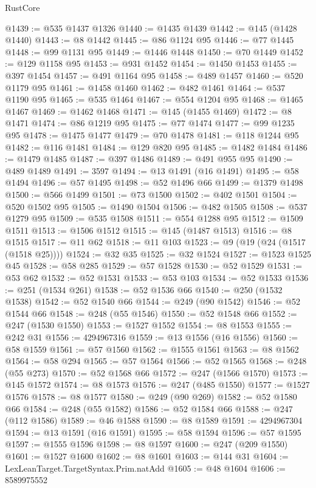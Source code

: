 \begin{lexlean}{RustCore}
\begin{coremodule}
@1439 := @535 @1437 @1326
@1440 := @1435 @1439
@1442 := @145 (@1428 @1440)
@1443 := @8 @1442
@1445 := @86 @1124 @95
@1446 := @77 @1445
@1448 := @99 @1131 @95
@1449 := @1446 @1448
@1450 := @70 @1449
@1452 := @129 @1158 @95
@1453 := @931 @1452
@1454 := @1450 @1453
@1455 := @397 @1454
@1457 := @491 @1164 @95
@1458 := @489 @1457
@1460 := @520 @1179 @95
@1461 := @1458 @1460
@1462 := @482 @1461
@1464 := @537 @1190 @95
@1465 := @535 @1464
@1467 := @554 @1204 @95
@1468 := @1465 @1467
@1469 := @1462 @1468
@1471 := @145 (@1455 @1469)
@1472 := @8 @1471
@1474 := @86 @1219 @95
@1475 := @77 @1474
@1477 := @99 @1235 @95
@1478 := @1475 @1477
@1479 := @70 @1478
@1481 := @118 @1244 @95
@1482 := @116 @1481
@1484 := @129 @820 @95
@1485 := @1482 @1484
@1486 := @1479 @1485
@1487 := @397 @1486
@1489 := @491 @955 @95
@1490 := @489 @1489
@1491 := 3597
@1494 := @13 @1491 (@16 @1491)
@1495 := @58 @1494
@1496 := @57 @1495
@1498 := @52 @1496 @66
@1499 := @1379 @1498
@1500 := @566 @1499
@1501 := @73 @1500
@1502 := @402 @1501
@1504 := @520 @1502 @95
@1505 := @1490 @1504
@1506 := @482 @1505
@1508 := @537 @1279 @95
@1509 := @535 @1508
@1511 := @554 @1288 @95
@1512 := @1509 @1511
@1513 := @1506 @1512
@1515 := @145 (@1487 @1513)
@1516 := @8 @1515
@1517 := @11 @62
@1518 := @11 @103
@1523 := @9 (@19 (@24 (@1517 (@1518 @25))))
@1524 := @32 @35
@1525 := @32 @1524
@1527 := @1523 @1525 @45
@1528 := @58 @285
@1529 := @57 @1528
@1530 := @52 @1529
@1531 := @53 @62
@1532 := @52 @1531
@1533 := @53 @103
@1534 := @52 @1533
@1536 := @251 (@1534 @261)
@1538 := @52 @1536 @66
@1540 := @250 (@1532 @1538)
@1542 := @52 @1540 @66
@1544 := @249 (@90 @1542)
@1546 := @52 @1544 @66
@1548 := @248 (@55 @1546)
@1550 := @52 @1548 @66
@1552 := @247 (@1530 @1550)
@1553 := @1527 @1552
@1554 := @8 @1553
@1555 := @242 @31
@1556 := 4294967316
@1559 := @13 @1556 (@16 @1556)
@1560 := @58 @1559
@1561 := @57 @1560
@1562 := @1555 @1561
@1563 := @8 @1562
@1564 := @58 @294
@1565 := @57 @1564
@1566 := @52 @1565
@1568 := @248 (@55 @273)
@1570 := @52 @1568 @66
@1572 := @247 (@1566 @1570)
@1573 := @145 @1572
@1574 := @8 @1573
@1576 := @247 (@485 @1550)
@1577 := @1527 @1576
@1578 := @8 @1577
@1580 := @249 (@90 @269)
@1582 := @52 @1580 @66
@1584 := @248 (@55 @1582)
@1586 := @52 @1584 @66
@1588 := @247 (@112 @1586)
@1589 := @46 @1588
@1590 := @8 @1589
@1591 := 4294967304
@1594 := @13 @1591 (@16 @1591)
@1595 := @58 @1594
@1596 := @57 @1595
@1597 := @1555 @1596
@1598 := @8 @1597
@1600 := @247 (@209 @1550)
@1601 := @1527 @1600
@1602 := @8 @1601
@1603 := @144 @31
@1604 := LexLeanTarget.TargetSyntax.Prim.natAdd
@1605 := @48 @1604
@1606 := 8589975552

\end{coremodule}
\end{lexlean}
